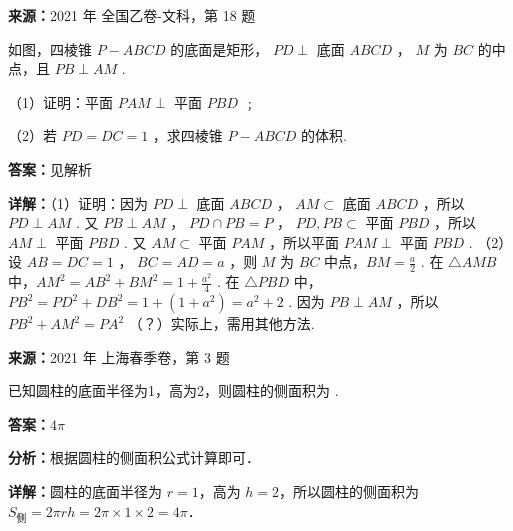 \begin{question}[points=12]
\textbf{来源：}2021 年 全国乙卷-文科，第 18 题\par
如图，四棱锥 $P-ABCD$ 的底面是矩形， $PD \perp$ 底面 $ABCD$ ， $M$ 为 $BC$ 的中点，且 $PB \perp AM$ .

（1）证明：平面 $PAM \perp$ 平面 $PBD$ ﹔

（2）若 $PD = DC = 1$ ，求四棱锥 $P-ABCD$ 的体积.
\begin{solution}
\textbf{答案：}见解析

\textbf{详解：}（1）证明：因为 $PD \perp$ 底面 $ABCD$ ， $AM \subset$ 底面 $ABCD$ ，所以 $PD \perp AM$ .
又 $PB \perp AM$ ， $PD \cap PB = P$ ， $PD, PB \subset$ 平面 $PBD$ ，所以 $AM \perp$ 平面 $PBD$ .
又 $AM \subset$ 平面 $PAM$ ，所以平面 $PAM \perp$ 平面 $PBD$ .
（2）设 $AB = DC = 1$ ， $BC = AD = a$ ，则 $M$ 为 $BC$ 中点，$BM = \frac{a}{2}$ .
在 $\triangle AMB$ 中，$AM^2 = AB^2 + BM^2 = 1 + \frac{a^2}{4}$ .
在 $\triangle PBD$ 中，$PB^2 = PD^2 + DB^2 = 1 + (1+a^2) = a^2+2$ .
因为 $PB \perp AM$ ，所以 $PB^2 + AM^2 = PA^2$ （？）实际上，需用其他方法.
\end{solution}
\end{question}

\begin{question}[points=4]
\textbf{来源：}2021 年 上海春季卷，第 3 题\par
已知圆柱的底面半径为1，高为2，则圆柱的侧面积为  .
\fillin[{$4\pi$}]
\begin{solution}
\textbf{答案：}$4\pi$

\textbf{分析：}根据圆柱的侧面积公式计算即可．

\textbf{详解：}圆柱的底面半径为 $r=1$，高为 $h=2$，所以圆柱的侧面积为 $S_{\text{侧}}=2\pi rh=2\pi\times 1\times 2=4\pi$．
\end{solution}
\end{question}

